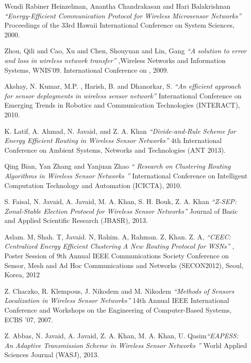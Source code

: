 \documentclass[journal]{IEEEtran}
\begin{document}
\begin{thebibliography}{1}

   Wendi Rabiner Heinzelman, Anantha Chandrakasan and Hari Balakrishnan {\em ``Energy-Efficient Communication Protocol for Wireless Microsensor Networks''}   Proceedings of the 33rd Hawaii International Conference on System Sciences, 2000.

    Zhou, Qili and Cao, Xu and Chen, Shouyuan and Lin, Gang {\em ``A solution to error and loss in wireless network transfer''} ,Wireless Networks and Information Systems, WNIS'09. International Conference on , 2009.

    Akshay, N. Kumar, M.P. , Harish, B. and Dhanorkar, S. {\em ``An efficient approach for sensor deployments in wireless sensor network''} International Conference on Emerging Trends in Robotics and Communication Technologies (INTERACT), 2010.

   K. Latif, A. Ahmad, N. Javaid, and Z. A. Khan {\em ``Divide-and-Rule Scheme for Energy Efficient Routing in Wireless Sensor Networks''} 4th International Conference on Ambient Systems, Networks and Technologies (ANT 2013).

    Qing Bian, Yan Zhang and Yanjuan Zhao  {\em `` Research on Clustering Routing Algorithms in Wireless Sensor Networks ''} International Conference on Intelligent Computation Technology and Automation (ICICTA), 2010.

   S. Faisal, N. Javaid, A. Javaid, M. A. Khan, S. H. Bouk, Z. A. Khan {\em ``Z-SEP: Zonal-Stable Election Protocol for Wireless Sensor Networks''} Journal of Basic and Applied Scientific Research (JBASR), 2013.

   Aslam. M, Shah. T, Javaid. N, Rahim. A, Rahman. Z, Khan. Z. A, {\em ``CEEC: Centralized Energy Efficient Clustering A New Routing Protocol for WSNs''} , Poster Session of 9th Annual IEEE Communications Society Conference on Sensor, Mesh and Ad Hoc Communications and Networks (SECON2012), Seoul, Korea, 2012

    Z. Chaczko, R. Klempous, J. Nikodem and M. Nikodem  {\em ``Methods of Sensors Localization in Wireless Sensor Networks''} 14th Annual IEEE International Conference and Workshops on the Engineering of Computer-Based Systems, ECBS '07,  2007.

   Z. Abbas, N. Javaid, A. Javaid, Z. A. Khan, M. A. Khan, U. Qasim{\em ``EAPESS: An Adaptive Transmission Scheme in Wireless Sensor Networks ''} World Applied Sciences Journal (WASJ), 2013.


\end{thebibliography}
\end{document}

